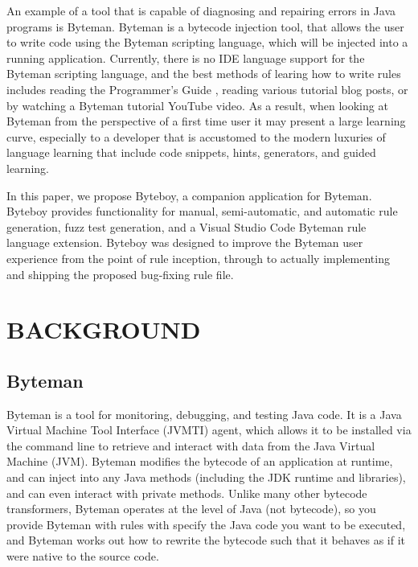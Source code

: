 \documentclass[letterpaper,twocolumn,10pt]{article}
\begin{document}
An example of a tool that is capable of diagnosing and repairing errors in Java programs is Byteman\cite{bytemanwebsite}. Byteman is a bytecode injection tool, that allows the user to write code using the Byteman scripting language, which will be injected into a running application. Currently, there is no IDE language support for the Byteman scripting language, and the best methods of learing how to write rules includes reading the Programmer's Guide \cite{bytemanguide}, reading various tutorial blog posts\cite{bytemanblog}, or by watching a Byteman tutorial YouTube video\cite{bytemanvideo}. As a result, when looking at Byteman from the perspective of a first time user it may present a large learning curve, especially to a developer that is accustomed to the modern luxuries of language learning that include code snippets, hints, generators\cite{yoman}, and guided learning.

In this paper, we propose Byteboy\cite{byteboy}, a companion application for Byteman. Byteboy provides functionality for manual, semi-automatic, and automatic rule generation, fuzz test generation, and a Visual Studio Code Byteman rule language extension. Byteboy was designed to improve the Byteman user experience from the point of rule inception, through to actually implementing and shipping the proposed bug-fixing rule file.



\section{BACKGROUND}

\subsection{Byteman}

Byteman is a tool for monitoring, debugging, and testing Java code\cite{bytemanwebsite}. It is a Java Virtual Machine Tool Interface (JVMTI) agent, which allows it to be installed via the command line to retrieve and interact with data from the Java Virtual Machine (JVM). Byteman modifies the bytecode of an application at runtime, and can inject into any Java methods (including the JDK runtime and libraries), and can even interact with private methods\cite{bytemanwebsite}. Unlike many other bytecode transformers, Byteman operates at the level of Java (not bytecode), so you provide Byteman with rules with specify the Java code you want to be executed, and Byteman works out how to rewrite the bytecode such that it behaves as if it were native to the source code\cite{bytemanwebsite}.
\end{document}
